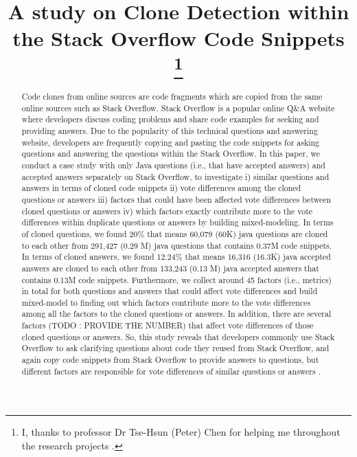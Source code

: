 \documentclass[conference]{IEEEtran}
\begin{document}
	
	\title{A study on Clone Detection within the Stack Overflow Code Snippets\\
		\thanks{I, thanks to professor Dr Tse-Hsun (Peter) Chen for helping me throughout the research projects .}
	}
	
	\author{
	}
	
	\maketitle
	
	\begin{abstract}
		Code clones from online sources are code fragments which are copied from the same online sources such as Stack Overflow. Stack Overflow is a popular online Q\&A website where developers discuss coding problems and share code examples for seeking and providing answers. Due to the popularity of this technical questions and answering website, developers are frequently copying and pasting the code snippets for asking questions and answering the questions within the Stack Overflow. In this paper, we conduct a case study with only Java questions (i.e., that have accepted answers) and accepted answers separately on Stack Overflow, to investigate i) similar questions and answers in terms of cloned code snippets ii) vote differences among the cloned  questions or answers iii) factors that could have been affected vote differences between cloned questions or answers iv) which factors exactly contribute more to the vote differences within duplicate questions or answers by building mixed-modeling. In terms of cloned questions, we found 20\% that means 60,079 (60K) java questions are cloned to each other from 291,427 (0.29 M) java questions that contains 0.37M code snippets. In terms of cloned answers, we found 12.24\% that means 16,316 (16.3K) java accepted answers are cloned to each other from 133,243 (0.13 M) java accepted answers that contains 0.13M code snippets. Furthermore, we collect around 45 factors (i.e., metrics)  in total for both questions and answers that could affect vote differences and build mixed-model to finding out which factors contribute more to the vote differences among all the factors to the cloned questions or answers. In addition, there are several factors (TODO : PROVIDE THE NUMBER) that affect vote differences of those cloned questions or answers. So, this study reveals that developers commonly use Stack Overflow to ask clarifying questions about code they reused from Stack Overflow, and again copy code snippets from Stack Overflow to provide answers to questions, but different factors are responsible for vote differences of similar questions or answers . 
		
	\end{abstract}
	
\end{document}
